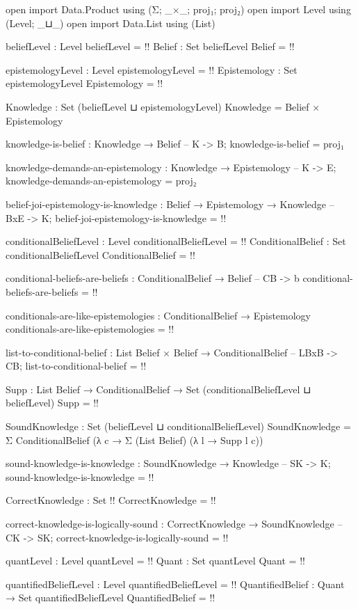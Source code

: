 \begin{code}
open import Data.Product using (Σ; _×_; proj₁; proj₂)
open import Level using (Level; _⊔_)
open import Data.List using (List)

beliefLevel : Level
beliefLevel = {!!}
Belief : Set beliefLevel
Belief = {!!}

epistemologyLevel : Level
epistemologyLevel = {!!}
Epistemology : Set epistemologyLevel
Epistemology = {!!}

Knowledge : Set (beliefLevel ⊔ epistemologyLevel)
Knowledge = Belief × Epistemology

knowledge-is-belief : Knowledge → Belief -- K -> B;
knowledge-is-belief = proj₁

knowledge-demands-an-epistemology : Knowledge → Epistemology -- K -> E;
knowledge-demands-an-epistemology = proj₂

belief-joi-epistemology-is-knowledge : Belief → Epistemology → Knowledge -- BxE -> K;
belief-joi-epistemology-is-knowledge = {!!}

conditionalBeliefLevel : Level
conditionalBeliefLevel = {!!}
ConditionalBelief : Set conditionalBeliefLevel
ConditionalBelief = {!!}

conditional-beliefs-are-beliefs : ConditionalBelief → Belief -- CB -> b
conditional-beliefs-are-beliefs = {!!}

conditionals-are-like-epistemologies : ConditionalBelief → Epistemology
conditionals-are-like-epistemologies = {!!}

list-to-conditional-belief : List Belief × Belief → ConditionalBelief  -- LBxB -> CB;
list-to-conditional-belief = {!!}

Supp : List Belief → ConditionalBelief → Set (conditionalBeliefLevel ⊔ beliefLevel)
Supp = {!!}

SoundKnowledge : Set (beliefLevel ⊔ conditionalBeliefLevel)
SoundKnowledge = Σ ConditionalBelief (λ c → Σ (List Belief) (λ l → Supp l c))

sound-knowledge-is-knowledge : SoundKnowledge → Knowledge -- SK -> K;
sound-knowledge-is-knowledge = {!!}

CorrectKnowledge : Set {!!}
CorrectKnowledge = {!!}

correct-knowledge-is-logically-sound : CorrectKnowledge → SoundKnowledge -- CK -> SK;
correct-knowledge-is-logically-sound = {!!}

quantLevel : Level
quantLevel = {!!}
Quant : Set quantLevel
Quant = {!!}

quantifiedBeliefLevel : Level
quantifiedBeliefLevel = {!!}
QuantifiedBelief : Quant → Set quantifiedBeliefLevel
QuantifiedBelief = {!!}


\end{code}
